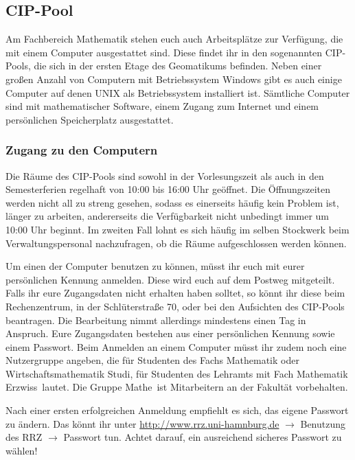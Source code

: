 \subsection{CIP-Pool}

Am Fachbereich Mathematik stehen euch auch Arbeitsplätze zur Verfügung, die mit
einem Computer ausgestattet sind. Diese findet ihr in den sogenannten
CIP-Pools, die sich in der ersten Etage des Geomatikums befinden. Neben einer
großen Anzahl von Computern mit Betriebssystem Windows gibt es auch einige
Computer auf denen UNIX als Betriebssystem installiert ist. Sämtliche Computer
sind mit mathematischer Software, einem Zugang zum Internet und einem
persönlichen Speicherplatz ausgestattet.

\subsubsection{Zugang zu den Computern}

Die Räume des CIP-Pools sind sowohl in der Vorlesungszeit als auch in den
Semesterferien regelhaft von 10:00 bis 16:00 Uhr geöffnet. Die Öffnungszeiten
werden nicht all zu streng gesehen, sodass es einerseits häufig kein Problem
ist, länger zu arbeiten, andererseits die Verfügbarkeit nicht unbedingt immer
um 10:00 Uhr beginnt. Im zweiten Fall lohnt es sich häufig im selben Stockwerk
beim Verwaltungspersonal nachzufragen, ob die Räume aufgeschlossen werden
können.

Um einen der Computer benutzen zu können, müsst ihr euch mit eurer persönlichen
Kennung anmelden. Diese wird euch auf dem Postweg mitgeteilt. Falls ihr eure
Zugangsdaten nicht erhalten haben solltet, so könnt ihr diese beim
Rechenzentrum, in der Schlüterstraße 70, oder bei den Aufsichten des CIP-Pools
beantragen. Die Bearbeitung nimmt allerdings mindestens einen Tag in Anspruch.
Eure Zugangsdaten bestehen aus einer persönlichen Kennung sowie einem Passwort.
Beim Anmelden an einem Computer müsst ihr zudem noch eine Nutzergruppe angeben,
die für Studenten des Fachs Mathematik oder Wirtschaftsmathematik \glqq
Studi\grqq, für Studenten des Lehramts mit Fach Mathematik \glqq Erzwiss\grqq\
lautet. Die Gruppe \glqq Mathe\grqq\ ist Mitarbeitern an der Fakultät
vorbehalten.

Nach einer ersten erfolgreichen Anmeldung empfiehlt es sich, das eigene
Passwort zu ändern. Das könnt ihr unter \url{http://www.rrz.uni-hamnburg.de}
$\rightarrow$ Benutzung des RRZ $\rightarrow$ Passwort tun. Achtet darauf, ein
ausreichend sicheres Passwort zu wählen!

